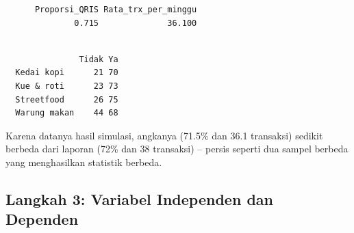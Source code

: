 \documentclass[
  indonesian,
  letterpaper,
]{book}
\newenvironment{Shaded}{\begin{snugshade}}{\end{snugshade}}
\newcommand{\AttributeTok}[1]{\textcolor[rgb]{0.40,0.45,0.13}{#1}}
\newcommand{\DecValTok}[1]{\textcolor[rgb]{0.68,0.00,0.00}{#1}}
\newcommand{\FunctionTok}[1]{\textcolor[rgb]{0.28,0.35,0.67}{#1}}
\newcommand{\NormalTok}[1]{\textcolor[rgb]{0.00,0.23,0.31}{#1}}
\newcommand{\OtherTok}[1]{\textcolor[rgb]{0.00,0.23,0.31}{#1}}
\newcommand{\SpecialCharTok}[1]{\textcolor[rgb]{0.37,0.37,0.37}{#1}}
\newcommand{\StringTok}[1]{\textcolor[rgb]{0.13,0.47,0.30}{#1}}
\begin{document}
\begin{Shaded}
\end{Shaded}

\begin{verbatim}
      Proporsi_QRIS Rata_trx_per_minggu 
              0.715              36.100 
\end{verbatim}

\begin{Shaded}
\end{Shaded}

\begin{verbatim}
              
               Tidak Ya
  Kedai kopi      21 70
  Kue & roti      23 73
  Streetfood      26 75
  Warung makan    44 68
\end{verbatim}

Karena datanya hasil simulasi, angkanya (71.5\% dan 36.1 transaksi)
sedikit berbeda dari laporan (72\% dan 38 transaksi) -- persis seperti
dua sampel berbeda yang menghasilkan statistik berbeda.

\subsection{Langkah 3: Variabel Independen dan
Dependen}\label{langkah-3-variabel-independen-dan-dependen}
\end{document}
